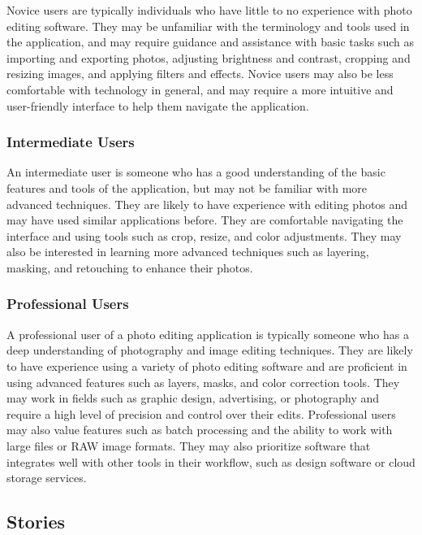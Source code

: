 \documentclass[11pt,a4paper]{article}
\begin{document}
Novice users are typically individuals who have little to no experience with
photo editing software. They may be unfamiliar with the terminology and tools
used in the application, and may require guidance and assistance with basic
tasks such as importing and exporting photos, adjusting brightness and contrast,
cropping and resizing images, and applying filters and effects. Novice users may
also be less comfortable with technology in general, and may require a more
intuitive and user-friendly interface to help them navigate the application.


\subsubsection*{Intermediate Users}

An intermediate user is someone who has a good understanding of the basic
features and tools of the application, but may not be familiar with more
advanced techniques. They are likely to have experience with editing photos and
may have used similar applications before. They are comfortable navigating the
interface and using tools such as crop, resize, and color adjustments. They may
also be interested in learning more advanced techniques such as layering,
masking, and retouching to enhance their photos. 

\subsubsection*{Professional Users}

A professional user of a photo editing application is typically someone who has
a deep understanding of photography and image editing techniques. They are
likely to have experience using a variety of photo editing software and are
proficient in using advanced features such as layers, masks, and color
correction tools. They may work in fields such as graphic design, advertising,
or photography and require a high level of precision and control over their
edits. Professional users may also value features such as batch processing and
the ability to work with large files or RAW image formats. They may also
prioritize software that integrates well with other tools in their workflow,
such as design software or cloud storage services.

\pagebreak

\subsection*{Stories}
\end{document}
